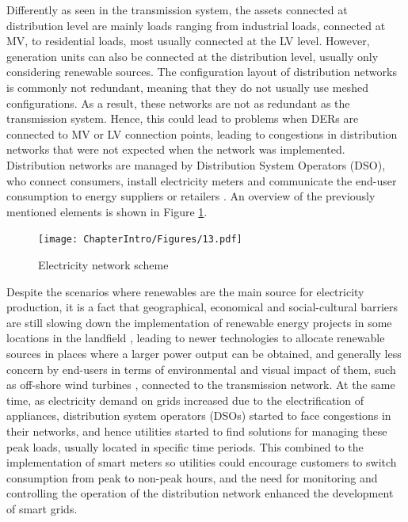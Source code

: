 Differently as seen in the transmission system, the assets connected at distribution level are mainly loads ranging from industrial loads, connected at MV, to residential loads, most usually connected at the LV level. However, generation units can also be connected  at the distribution level, usually only considering renewable sources. The configuration layout of distribution networks is commonly not redundant, meaning that they do not usually use meshed configurations. As a result, these networks are not as redundant as the transmission system. Hence, this could lead to problems when DERs are connected to MV or LV connection points, leading to congestions  in distribution networks that were not expected when the network was implemented. Distribution networks are managed by Distribution System Operators (DSO), who connect consumers, install electricity meters and communicate the end-user consumption to energy suppliers or retailers \cite{Erbach2016}. An overview of the previously mentioned elements is shown in Figure \ref{fig:networkscheme}. 


\begin{figure}[htbp]
	\centering 
	\texttt{[image: ChapterIntro/Figures/13.pdf]}
		\caption{Electricity network scheme}  
		\label{fig:networkscheme}
\end{figure}


Despite the scenarios where renewables are the main source for electricity production, it is a fact that geographical, economical and social-cultural barriers are still slowing down the implementation of renewable energy projects in some locations in the landfield \cite{ASANTE2020111479, barriers2020}, leading to newer technologies to allocate renewable sources in places where a larger power output can be obtained, and generally less concern by end-users in terms of environmental and visual impact of them, such as off-shore wind turbines \cite{Kaldellis2016, KPMG2019}, connected to the transmission network. At the same time, as electricity demand on grids increased due to the electrification of appliances, distribution system operators (DSOs) started to face congestions in their networks, and hence utilities started to find solutions for managing these peak loads, usually located in specific time periods.  This combined to the implementation of smart meters so utilities could encourage customers to switch consumption from peak to non-peak hours, and the need for monitoring and controlling the operation of the distribution network enhanced the development of smart grids.

